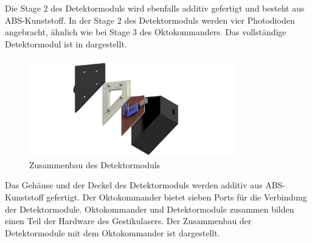 Die Stage 2 des Detektormoduls wird ebenfalls additiv gefertigt und besteht aus ABS-Kunststoff. In der Stage 2 des Detektormoduls werden vier Photodioden angebracht, ähnlich wie bei Stage 3 des Oktokommanders. Das vollständige Detektormodul ist in  dargestellt.

\begin{figure}[h]
	\centering
	\includegraphics[width=9cm]{../CAD_Bilder/Detektormodul_raytraced.png}
	\caption{Zusammenbau des Detektormoduls}
	\label{fig:DetektorZusammenbau}
\end{figure}

Das Gehäuse und der Deckel des Detektormoduls werden additiv aus ABS-Kunststoff gefertigt.
Der Oktokommander bietet sieben Ports für die Verbindung der Detektormodule. Oktokommander und Detektormodule zusammen bilden einen Teil der Hardware des Gestikulasers. Der Zusammenbau der Detektormodule mit dem Oktokommander ist  dargestellt.

